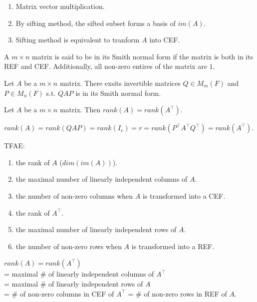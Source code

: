 \documentclass[12pt]{article}
\begin{document}
\begin{pf}
    \begin{enumerate}
        \item Matrix vector multiplication.
        \item By sifting method, the sifted subset forms a basis of $im(A)$.
        \item Sifting method is equivalent to tranform $A$ into CEF.
    \end{enumerate}
\end{pf}

\begin{definition}
 A $m\times n$ matrix is said to be in its Smith normal form if the matrix is both in its REF and CEF.
 Additionally, all non-zero entires of the matrix are $1$.
\end{definition}

\begin{theorem}
Let $A$ be a $m\times n$ matrix.
There exsits invertible matrices $Q\in M_m(F)$ and $P\in M_n(F)$ s.t.
$QAP$ is in its Smith normal form.
\end{theorem}


\begin{theorem}
    Let $A$ be a $m\times n$ matrix. Then $rank(A)=rank(A^{\top})$.
\end{theorem}

\begin{pf}
    $rank(A)=rank(QAP)=rank(I_r)=r=rank(P^\top A^\top Q^\top)=rank(A^\top).$
\end{pf}


\begin{theorem}
    TFAE:
    \begin{enumerate}
        \item the rank of $A$ ($dim(im(A))$).
        \item the maximal number of linearly independent columns of $A$.
        \item the number of non-zero columns when $A$ is transformed into a CEF.
        \item the rank of $A^\top$.
        \item the maximal number of linearly independent rows of $A$.
        \item the number of non-zero rows when $A$ is transformed into a REF.
    \end{enumerate}
\end{theorem}

\begin{pf}
    $rank(A)=rank(A^\top)$\\
    = maximal \# of linearly independent columns of $A^\top$\\
    = maximal \# of linearly independent rows of $A$\\
    = \# of non-zero columns in CEF of $A^\top$ = \# of non-zero rows in REF of $A$.
\end{pf}
\end{document}
